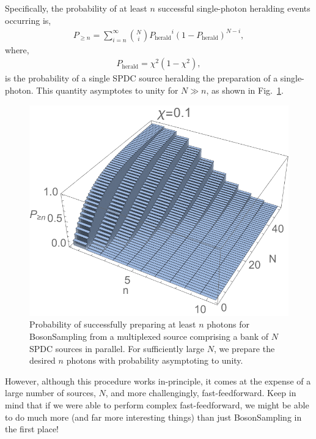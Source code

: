 \documentclass[aps, rmp, twocolumn, amsmath, amssymb, nofootinbib, superscriptaddress, longbibliography, floatfix, table-of-contents, eqsecnum]{revtex4-1}
\begin{document}
Specifically, the probability of at least $n$ successful single-photon heralding events occurring is,
\begin{align}
P_{\geq n} = \sum_{i=n}^\infty \binom{N}{i} 	{P_\text{herald}}^i (1-P_\text{herald})^{N-i},
\end{align}
where,
\begin{align}
	P_\text{herald} = \chi^2(1-\chi^2),
\end{align}
is the probability of a single SPDC source heralding the preparation of a single-photon. This quantity asymptotes to unity for \mbox{$N\gg n$}, as shown in Fig.~\ref{fig:multiplex_bs_res}.

\begin{figure}[!htb]
\includegraphics[width=0.95\columnwidth]{multiplex_bs}
\caption{Probability of successfully preparing at least $n$ photons for {\sc BosonSampling} from a multiplexed source comprising a bank of $N$ SPDC sources in parallel. For sufficiently large $N$, we prepare the desired $n$ photons with probability asymptoting to unity.} \label{fig:multiplex_bs_res}
\end{figure}

However, although this procedure works in-principle, it comes at the expense of a large number of sources, $N$, and more challengingly, fast-feedforward. Keep in mind that if we were able to perform complex fast-feedforward, we might be able to do much more (and far more interesting things) than just {\sc BosonSampling} in the first place!

%
%
\end{document}
